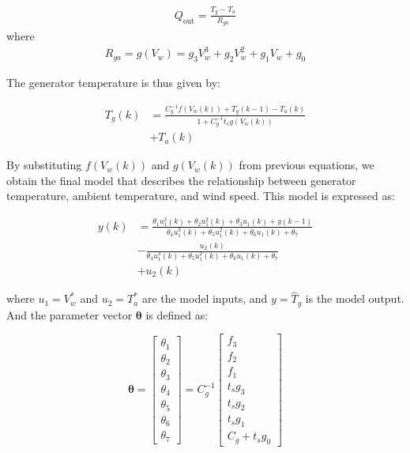 \documentclass[10pt,letterpaper]{article}
\begin{document}
\begin{align*}
    Q_{\text{out}} = \frac{T_g - T_a}{R_{ga}}
\end{align*}
where
\begin{align*}
    R_{ga} = g(V_w) = g_3 V_w^3 + g_2 V_w^2 + g_1 V_w + g_0
\end{align*}

The generator temperature is thus given by:

\begin{align*}
    T_g(k) &= \frac{C^{-1}_gf(V_w(k)) + T_g(k-1) - T_a(k)}{1 + C^{-1}_gt_sg(V_w(k))} \nonumber \\
    &+ T_a(k)
\end{align*}


By substituting $f(V_w(k))$ and $g(V_w(k))$ from previous equations, we obtain the final model that describes the relationship between generator temperature, ambient temperature, and wind speed. This model is expressed as:

\begin{align} \label{Eq:Turbine}
    y(k) &= \frac{\theta_1 u_1^3(k) + \theta_2 u_1^2(k) + \theta_3 u_1(k) + y(k - 1)}{\theta_4 u_1^3(k) + \theta_5 u_1^2(k) + \theta_6 u_1(k) + \theta_7} \nonumber \\
    & -\frac{u_2(k)}{\theta_4 u_1^3(k) + \theta_5 u_1^2(k) + \theta_6 u_1(k)
    + \theta_7}  \nonumber \\
    & + u_2(k) 
\end{align}


where \(u_1 = V_w^*\) and \(u_2 = T_a^*\) are the model inputs, and \(y = \hat{T}_g\) is the model output. And the parameter vector \(\boldsymbol{\theta}\) is defined as:

\[
\boldsymbol{\theta} = \begin{bmatrix}
\theta_1 \\
\theta_2 \\
\theta_3 \\
\theta_4 \\
\theta_5 \\
\theta_6 \\
\theta_7 
\end{bmatrix}
= C_g^{-1} \begin{bmatrix}
f_3 \\
f_2 \\
f_1 \\
t_sg_3 \\
t_sg_2 \\
t_sg_1 \\
C_g + t_sg_0 
\end{bmatrix}
\]
\end{document}
